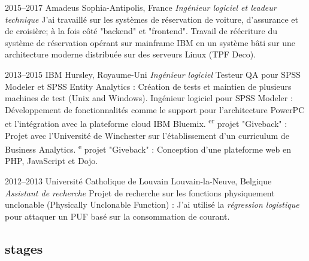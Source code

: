 \documentclass[]{friggeri-cv} %
\begin{document}
\begin{entrylist}


\entry
{2015--2017}
{Amadeus}
{Sophia-Antipolis, France}
{\emph{Ingénieur logiciel et leadeur technique}
\medbreak
J’ai travaillé sur les systèmes de réservation de voiture, d'assurance et de croisière; à la
fois côté "backend" et "frontend".
\smallbreak
Travail de réécriture du système de
    réservation opérant sur mainframe IBM en un système bâti sur une
    architecture moderne distribuée sur des serveurs Linux (TPF Deco).
\bigbreak %
}

\entry
{2013--2015}
{IBM}
{Hursley, Royaume-Uni}
{\emph{Ingénieur logiciel}
\medbreak
Testeur QA pour SPSS Modeler et SPSS Entity Analytics : Création de
    tests et maintien de plusieurs machines de test (Unix and Windows).
\smallbreak
Ingénieur logiciel pour SPSS Modeler : Développement de fonctionnalités comme le
    support pour l'architecture PowerPC et l’intégration avec la plateforme cloud IBM Bluemix.
\textsuperscript{er} projet "Giveback" : Projet avec l’Université de Winchester sur
    l’établissement d’un curriculum de Business Analytics.
\textsuperscript{e} projet "Giveback" : Conception d’une plateforme web en PHP, JavaScript et
    Dojo.
\bigbreak %
}

\entry
{2012--2013}
{Université Catholique de Louvain}
{Louvain-la-Neuve, Belgique}
{\emph{Assistant de recherche}
\medbreak
Projet de recherche sur les fonctions physiquement
unclonable
(Physically Unclonable Function) :  J’ai utilisé la
\emph{régression logistique} pour attaquer un PUF basé sur la consommation de courant.
}

\end{entrylist}

\newpage

\subsection{stages}
\end{document}
